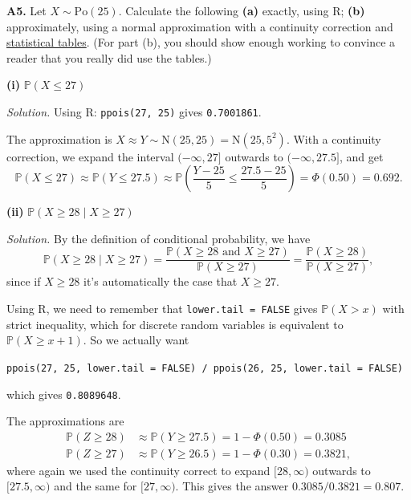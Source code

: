 \documentclass[
  a4paper,
]{book}
\theoremstyle{definition}
\theoremstyle{definition}
\theoremstyle{definition}
\theoremstyle{definition}
\theoremstyle{remark}
\begin{document}
\textbf{A5.} Let \(X \sim \mathrm{Po}(25)\). Calculate the following \textbf{(a)} exactly, using R; \textbf{(b)} approximately, using a normal approximation with a continuity correction and \href{https://mpaldridge.github.io/math1710/stat-tab.pdf}{statistical tables}. (For part (b), you should show enough working to convince a reader that you really did use the tables.)

\textbf{(i)} \(\mathbb P(X \leq 27)\)

\begin{myanswers}
\emph{Solution.}
Using R: \texttt{ppois(27,\ 25)} gives \texttt{0.7001861}.

The approximation is \(X \approx Y \sim \mathrm N(25, 25) = \mathrm{N}(25, 5^2)\). With a continuity correction, we expand the interval \((-\infty,27]\) outwards to \((-\infty, 27.5]\), and get
\[ \mathbb P(X \leq 27) \approx \mathbb P(Y \leq 27.5) \approx \mathbb P \left(\frac{Y - 25}{5} \leq \frac{27.5 - 25}{5}\right) = \Phi(0.50) = 0.692. \]

\end{myanswers}

\textbf{(ii)} \(\mathbb P(X \geq 28 \mid X \geq 27)\)

\begin{myanswers}
\emph{Solution.}
By the definition of conditional probability, we have
\[ \mathbb P(X \geq 28 \mid X \geq 27) =  \frac{\mathbb P(X \geq 28 \text{ and } X \geq 27)}{\mathbb P(X \geq 27)} = \frac{\mathbb P(X \geq 28)}{\mathbb P(X \geq 27)} ,\]
since if \(X \geq 28\) it's automatically the case that \(X \geq 27\).

Using R, we need to remember that \texttt{lower.tail\ =\ FALSE} gives \(\mathbb P(X > x)\) with strict inequality, which for discrete random variables is equivalent to \(\mathbb P(X \geq x +1)\). So we actually want

\texttt{ppois(27,\ 25,\ lower.tail\ =\ FALSE)\ /\ ppois(26,\ 25,\ lower.tail\ =\ FALSE)}

which gives \texttt{0.8089648}.

The approximations are
\begin{align*}
\mathbb P(Z \geq 28) &\approx \mathbb P(Y \geq 27.5) = 1 - \Phi(0.50) = 0.3085 \\
\mathbb P(Z \geq 27) &\approx \mathbb P(Y \geq 26.5) = 1 - \Phi(0.30) = 0.3821 ,
\end{align*}
where again we used the continuity correct to expand \([28,\infty)\) outwards to \([27.5,\infty)\) and the same for \([27,\infty)\). This
gives the answer \(0.3085/0.3821 = 0.807\).

\end{myanswers}
\end{document}
